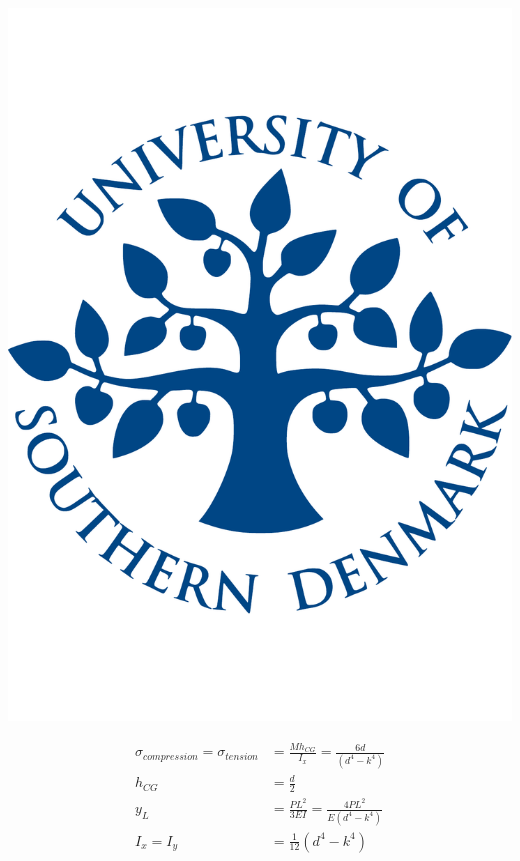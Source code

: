   \noindent\begin{minipage}{0.2\textwidth}%
      \includegraphics[width=\linewidth]{figures/sdu_logo.pdf}
  \end{minipage}%
  \hfill%
  \begin{minipage}{0.8\textwidth}
    \begin{equation}
    \begin{align*}
      \sigma _{compression} = \sigma _{tension} &= \frac{M h_{CG}}{I_x} = \frac{6 d}{(d^4 - k^4)}\\
      h_{CG} &= \frac{d}{2} \\
      y_L &= \frac{P L^2}{3EI} = \frac{4 P L^2}{E (d^4 - k^4)}\\
      I_x = I_y &= \frac{1}{12} (d^4 - k^4)
      \end{align*}
    \end{equation}
  \end{minipage}

